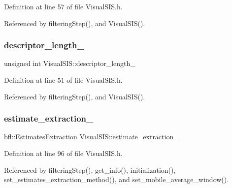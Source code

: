 Definition at line 57 of file Visual\+S\+I\+S.\+h.



Referenced by filtering\+Step(), and Visual\+S\+I\+S().

\mbox{\label{classVisualSIS_a030a089e79e98f530082889b6d1d7090}} 
\subsubsection{\texorpdfstring{descriptor\+\_\+length\+\_\+}{descriptor\_length\_}}
{\footnotesize\ttfamily unsigned int Visual\+S\+I\+S\+::descriptor\+\_\+length\+\_\+\hspace{0.3cm}{\ttfamily [protected]}}



Definition at line 51 of file Visual\+S\+I\+S.\+h.



Referenced by filtering\+Step(), and Visual\+S\+I\+S().

\mbox{\label{classVisualSIS_a5052345aafc5e7efc7d72f1ccbf0a4ac}} 
\subsubsection{\texorpdfstring{estimate\+\_\+extraction\+\_\+}{estimate\_extraction\_}}
{\footnotesize\ttfamily bfl\+::\+Estimates\+Extraction Visual\+S\+I\+S\+::estimate\+\_\+extraction\+\_\+\hspace{0.3cm}{\ttfamily [private]}}



Definition at line 96 of file Visual\+S\+I\+S.\+h.



Referenced by filtering\+Step(), get\+\_\+info(), initialization(), set\+\_\+estimates\+\_\+extraction\+\_\+method(), and set\+\_\+mobile\+\_\+average\+\_\+window().

\mbox{\label{classVisualSIS_aff43a51053f61e07a9803926111b9cc6}} 
